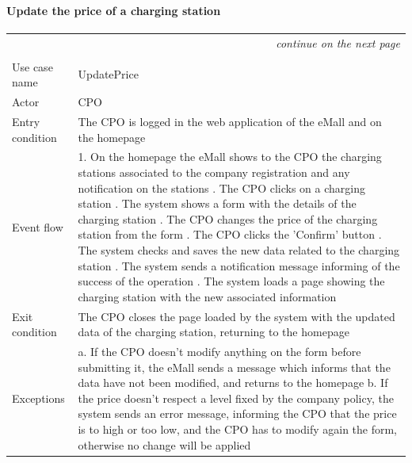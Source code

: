 \paragraph{Update the price of a charging station}
\begin{center}
    \begin{longtable}{p{4cm} p{11cm}}
    \multicolumn{2}{r}{\itshape{continue on the next page}}\\
    \endfoot 
    \\
    \endlastfoot
    \hline
     Use case name &  UpdatePrice\\
     \hline
     Actor & CPO \\
     \hline
     Entry condition & The CPO is logged in the web application of the eMall and on the homepage \\
     \hline
     Event flow &   1. On the homepage the eMall shows to the CPO the charging stations associated to the company                   registration and any notification on the stations \newline
                    2. The CPO clicks on a charging station \newline 
                    3. The system shows a form with the details of the charging station \newline
                    4. The CPO changes the price of the charging station from the form \newline
                    5. The CPO clicks the 'Confirm' button \newline
                    6. The system checks and saves the new data related to the charging station \newline
                    7. The system sends a notification message informing of the success of the operation \newline
                    8. The system loads a page showing the charging station with the new associated information\\
     \hline
     Exit condition &  The CPO closes the page loaded by the system with the updated data of the charging station, returning to the homepage \\
     \hline
     Exceptions &   a. If the CPO doesn't modify anything on the form before submitting it, the eMall sends a                       message which informs that the data have not been modified, and returns to the homepage \newline
                    b. If the price doesn't respect a level fixed by the company policy, the system sends an error message, informing the CPO that the price is to high or too low, and the CPO has to modify again the form, otherwise no change will be applied \newline

\end{longtable}
\end{center}
